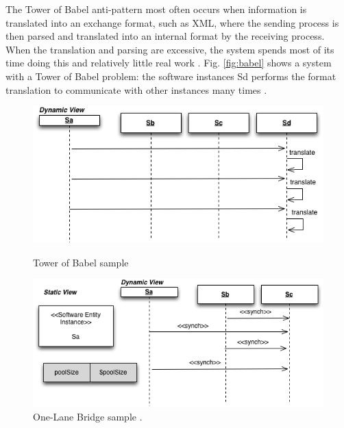 \documentclass[espaco=umemeio,chapter=TITLE,twoside,openright]{abnt}
\begin{document}
The Tower of Babel anti-pattern most often occurs when information is translated into an exchange format, such as XML, where the sending process is then parsed and translated into an
internal format by the receiving process. When the translation and parsing are excessive, the system spends most
of its time doing this and relatively little real work \cite{Smith2003}. Fig. \ref{fig:babel} shows a system with a Tower of Babel problem: the software instances Sd performs the format translation to communicate with other instances many times \cite{Vetoio2011}.

\begin{figure}[H]
\begin{minipage}{.5\textwidth}
\centering
\includegraphics[width=1\textwidth]{./images/babel2.png}
\caption{Tower of Babel sample \cite{Vetoio2011}}
\label{fig:babel}
\end{minipage}
\begin{minipage}{.5\textwidth}
\centering
\includegraphics[width=1\textwidth]{./images/onelane.png}
\caption{One-Lane Bridge sample \cite{Vetoio2011}.}
\label{fig:onelane}
\end{minipage}
\end{figure}
\end{document}
